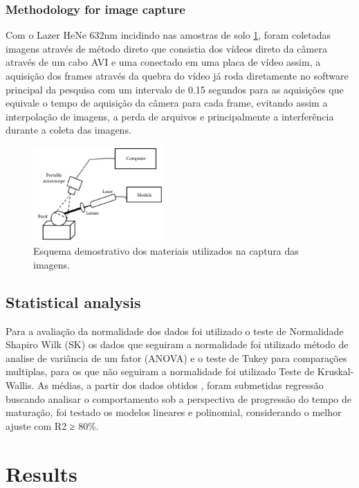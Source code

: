 \documentclass{elsarticle}
\begin{document}
\subsubsection{Methodology for image capture}
Com o Lazer HeNe 632nm incidindo nas amostras de solo \ref{fig:laser}, foram coletadas imagens através de método direto que consistia dos vídeos  direto da câmera através de um cabo AVI e uma conectado em uma placa de vídeo assim, a aquisição dos frames através da quebra do vídeo já roda diretamente no software principal da pesquisa com um intervalo de 0.15 segundos para as aquisições que equivale o tempo de aquisição da câmera para cada frame, evitando assim a interpolação de imagens, a perda de arquivos e principalmente a interferência durante a coleta das imagens.

\begin{figure}[!htb]
\centering
\includegraphics[width=5cm]{figure/materiais/setup.jpg}
\caption{Esquema demostrativo dos materiais utilizados na captura das imagens.}
\label{fig:laser}
\end{figure}


\newpage
\subsection{Statistical analysis}

Para a avaliação da normalidade dos dados foi utilizado o teste de Normalidade Shapiro Wilk (SK) os dados que seguiram a normalidade foi utilizado método de analise de variância de um fator (ANOVA) e o teste de Tukey para comparações multiplas, para os que não seguiram a normalidade foi utilizado Teste de Kruskal-Wallis. As médias, a partir dos dados obtidos , foram submetidas regressão buscando analisar o comportamento sob a perspectiva de progressão do tempo de maturação, foi testado os modelos lineares e polinomial, considerando o melhor ajuste com R2 ≥ 80\%.

\section{Results}
\end{document}
